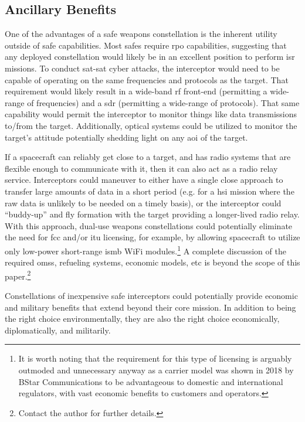 \subsection{Ancillary Benefits}

One of the advantages of a \ac{safe} weapons constellation is the
inherent utility outside of \ac{safe} capabilities.  Most \acp{safe}
require \ac{rpo} capabilities, suggesting that any deployed
constellation would likely be in an excellent position to perform
\ac{isr} missions.  To conduct sat-sat cyber attacks, the interceptor
would need to be capable of operating on the same frequencies and
protocols as the target.  That requirement would likely result in a
wide-band \ac{rf} front-end (permitting a wide-range of frequencies)
and a \acf{sdr} (permitting a wide-range of protocols).  That same
capability would permit the interceptor to monitor things like data
transmissions to/from the target.  Additionally, optical systems
could be utilized to monitor the target's attitude potentially
shedding light on any \ac{aoi} of the target.

If a spacecraft can reliably get close to a target, and has radio
systems that are flexible enough to communicate with it, then it can
also act as a radio relay service.  Interceptors could maneuver to
either have a single close approach to transfer large amounts of data
in a short period (e.g. for a \acl{hsi} mission where the raw data is
unlikely to be needed on a timely basis), or the interceptor could
``buddy-up'' and fly formation with the target providing a
longer-lived radio relay.  With this approach, dual-use weapons
constellations could potentially eliminate the need for \ac{fcc}
and/or \ac{itu} licensing, for example, by allowing spacecraft to
utilize only low-power short-range \ac{ismb} WiFi
modules.\footnote{It is worth noting that the requirement for this
type of licensing is arguably outmoded and unnecessary anyway as a
carrier model was shown in 2018 by BStar Communications to be
advantageous to domestic and international regulators, with vast
economic benefits to customers and operators.\cite{big-risks}} A
complete discussion of the required \acp{oms}, refueling systems,
economic models, etc is beyond the scope of this
paper.\footnote{Contact the author for further details.}

Constellations of inexpensive \ac{safe} interceptors could potentially
provide economic and military benefits that extend beyond their core
mission.  In addition to being the right choice environmentally, they
are also the right choice economically, diplomatically, and
militarily.
